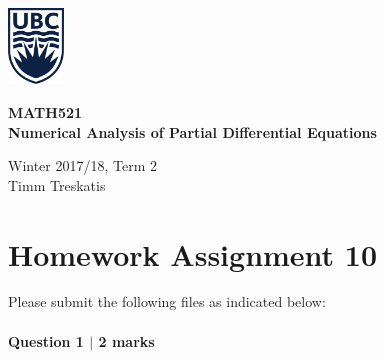 

\usepackage{amsfonts,amsmath,amssymb,braket,xcolor,enumerate,graphicx}
\usepackage[hidelinks]{hyperref}
\usepackage{listings,multicol,mathtools,textcomp,tikz,pgfplots,wrapfig}
\usepackage{tabularx}
\usepackage{booktabs}
\usetikzlibrary{arrows}

\pagestyle{empty}
\setlength{\parindent}{0pt}
\setlength{\parskip}{6pt}




\begin{minipage}{.2\textwidth}
\includegraphics[width=42pt]{ubc-logo.png}
\end{minipage}
\hfill
\begin{minipage}{.75\textwidth}
\setlength{\parskip}{6pt}
\begin{flushright}
{\sffamily
\textbf{MATH521}\\
\textbf{Numerical Analysis of Partial Differential Equations}

Winter 2017/18, Term 2\\
Timm Treskatis
}
\end{flushright}
\end{minipage}

\section*{Homework Assignment 10}

Please submit the following files as indicated below: %

\paragraph*{Question 1 $\vert$ 2 marks}%

